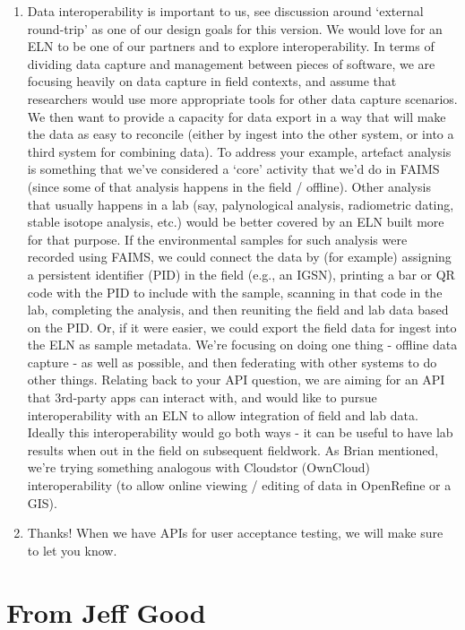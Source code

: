 \documentclass[a4paper,headings=small fontsize=10pt]{scrreprt}
\begin{document}
\begin{enumerate}
\item Data interoperability is important to us, see discussion around `external
  round-trip' as one of our design goals for this version. We would love
  for an ELN to be one of our partners and to explore interoperability. In 
  terms of dividing data capture and management between pieces of software, we 
  are focusing heavily on data capture in field contexts, and assume that 
  researchers would use more appropriate tools for other data capture scenarios.
  We then want to provide a capacity for data export in a way that will make the 
  data as easy to reconcile (either by ingest into the other system, or into a third
  system for combining data). To address your example, artefact analysis is something that we've 
  considered a `core' activity that we'd do in FAIMS (since some of that analysis happens in 
  the field / offline). Other analysis that usually happens in a lab (say, palynological 
  analysis, radiometric dating, stable isotope analysis, etc.) would be better covered by an ELN
  built more for that purpose. If the environmental samples for such analysis were recorded
  using FAIMS, we could connect the data by (for example) assigning a persistent identifier (PID) in the 
  field (e.g., an IGSN), printing a bar or QR code with the PID to include with the sample, scanning 
  in that code in the lab, completing the analysis, and then reuniting the field and lab data based 
  on the PID. Or, if it were easier, we could export the field data for ingest into the ELN 
  as sample metadata. We're focusing on doing one thing - offline data capture - as well as possible, 
  and then federating with other systems to do other things. Relating back to your API question, 
  we are aiming for an API that 3rd-party apps can interact with, and would like to pursue 
  interoperability with an ELN to allow integration of field and lab data. Ideally this 
  interoperability would go both ways - it can be useful to have lab results when out 
  in the field on subsequent fieldwork. As Brian mentioned, we're trying something 
  analogous with Cloudstor (OwnCloud) interoperability (to allow online viewing / 
  editing of data in OpenRefine or a GIS).
 
\item Thanks! When we have APIs for user acceptance testing, we will make
  sure to let you know.
 
\end{enumerate}

\section{From Jeff Good}
\end{document}
